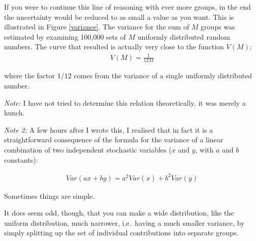 \documentclass[onecolumn]{article}
\begin{document}
If you were to continue this line of reasoning with ever more groups, in the
end the uncertainty would be reduced to as small a value as you want. This is
illustrated in Figure \ref{variance}. The variance for the sum of $M$ groups was
estimated by examining 100,000 sets of $M$ uniformly distributed random numbers.
The curve that resulted is actually very close to the function $V(M)$:
\begin{eqnarray}
\nonumber V(M) = \frac{1}{12M}
\end{eqnarray}

\noindent where the factor $1/12$ comes from the variance of a single uniformly
distributed number.

\emph{Note:} I have not tried to determine this relation theoretically,
it was merely a hunch.

\emph{Note 2:} A few hours after I wrote this, I realised that in fact it is a
straightforward consequence of the formula for the variance of a linear combination
of two independent stochastic variables ($x$ and $y$, with $a$ and $b$ constants):

\begin{eqnarray}
\nonumber Var(ax + by) = a^2 Var(x) + b^2 Var(y)
\end{eqnarray}

Sometimes things are simple.


It does seem odd, though, that you can make a wide distribution, like the uniform
distribution, much narrower, i.e.\ having a much smaller variance, by simply
splitting up the set of individual contributions into separate groups.



\end{document}
